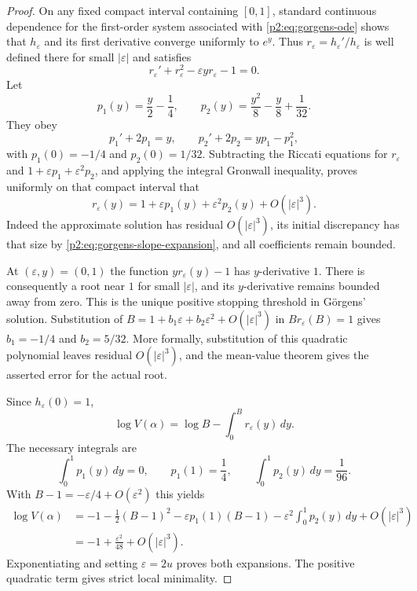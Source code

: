\documentclass[11pt,a4paper]{article}
\theoremstyle{definition}
\theoremstyle{remark}
\numberwithin{equation}{section}
\begin{document}
\begin{proof}
On any fixed compact interval containing $[0,1]$, standard continuous
dependence for the first-order system associated with
\eqref{p2:eq:gorgens-ode} shows that $h_\varepsilon$ and its first
derivative converge uniformly to $e^y$. Thus
$r_\varepsilon=h_\varepsilon'/h_\varepsilon$ is well defined there for
small $|\varepsilon|$ and satisfies
\[
 r_\varepsilon'+r_\varepsilon^2
       -\varepsilon y r_\varepsilon-1=0.
\]
Let
\[
 p_1(y)=\frac y2-\frac14,\qquad
 p_2(y)=\frac{y^2}{8}-\frac y8+\frac1{32}.
\]
They obey
\[
 p_1'+2p_1=y,\qquad
 p_2'+2p_2=yp_1-p_1^2,
\]
with $p_1(0)=-1/4$ and $p_2(0)=1/32$. Subtracting the Riccati
equations for $r_\varepsilon$ and
$1+\varepsilon p_1+\varepsilon^2p_2$, and applying the integral
Gronwall inequality, proves uniformly on that compact interval that
\begin{equation}\label{p2:eq:gorgens-riccati-expansion}
 r_\varepsilon(y)=1+\varepsilon p_1(y)
                         +\varepsilon^2p_2(y)
                         +O(|\varepsilon|^3).
\end{equation}
Indeed the approximate solution has residual $O(|\varepsilon|^3)$,
its initial discrepancy has that size by
\eqref{p2:eq:gorgens-slope-expansion}, and all coefficients remain bounded.

At $(\varepsilon,y)=(0,1)$ the function
$y r_\varepsilon(y)-1$ has $y$-derivative $1$. There is consequently
a root near $1$ for small $|\varepsilon|$, and its $y$-derivative
remains bounded away from zero. This is the unique positive stopping
threshold in G\"orgens' solution. Substitution of
$B=1+b_1\varepsilon+b_2\varepsilon^2+O(|\varepsilon|^3)$ in
$Br_\varepsilon(B)=1$ gives
$b_1=-1/4$ and $b_2=5/32$. More formally, substitution of this
quadratic polynomial leaves residual $O(|\varepsilon|^3)$, and the
mean-value theorem gives the asserted error for the actual root.

Since $h_\varepsilon(0)=1$,
\[
 \log V(\alpha)=\log B-\int_0^B r_\varepsilon(y)\,dy.
\]
The necessary integrals are
\[
 \int_0^1p_1(y)\,dy=0,\qquad
 p_1(1)=\frac14,\qquad
 \int_0^1p_2(y)\,dy=\frac1{96}.
\]
With $B-1=-\varepsilon/4+O(\varepsilon^2)$ this yields
\begin{align*}
 \log V(\alpha)
 &= -1-\frac12(B-1)^2
       -\varepsilon p_1(1)(B-1)
       -\varepsilon^2\int_0^1p_2(y)\,dy
       +O(|\varepsilon|^3)\\
 &= -1+\frac{\varepsilon^2}{48}+O(|\varepsilon|^3).
\end{align*}
Exponentiating and setting $\varepsilon=2u$ proves both expansions.
The positive quadratic term gives strict local minimality.
\end{proof}
\end{document}
